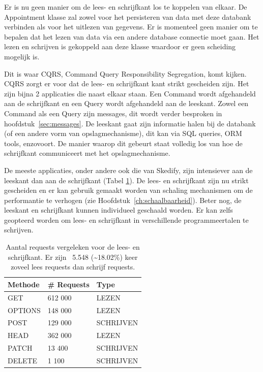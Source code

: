 
Er is nu geen manier om de lees- en schrijfkant los te koppelen van elkaar. De Appointment klasse zal zowel voor het persisteren van data met deze databank verbinden als voor het uitlezen van gegevens. Er is momenteel geen manier om te bepalen dat het lezen van data via een andere database connectie moet gaan. Het lezen en schrijven is gekoppeld aan deze klasse waardoor er geen scheiding mogelijk is.

Dit is waar \gls{CQRS}, Command Query Responsibility Segregation, komt kijken. \gls{CQRS} zorgt er voor dat de lees- en schrijfkant kant strikt gescheiden zijn. Het zijn bijna 2 applicaties die naast elkaar staan. Een Command wordt afgehandeld aan de schrijfkant en een Query wordt afgehandeld aan de leeskant. Zowel een Command als een Query zijn messages, dit wordt verder besproken in hoofdstuk~\ref{sec:messages}. De leeskant gaat zijn informatie halen bij de databank (of een andere vorm van opslagmechanisme), dit kan via \gls{SQL} queries, \gls{ORM} tools, enzovoort. De manier waarop dit gebeurt staat volledig los van hoe de schrijfkant communiceert met het opslagmechanisme.

De meeste applicaties, onder andere ook die van Skedify, zijn intensiever aan de leeskant dan aan de schrijfkant (Tabel \ref{cqrs-read-writes}). De lees- en schrijfkant zijn nu strikt gescheiden en er kan gebruik gemaakt worden van schaling mechanismen om de performantie te verhogen (zie Hoofdstuk~\ref{ch:schaalbaarheid}). Beter nog, de leeskant en schrijfkant kunnen individueel geschaald worden. Er kan zelfs geopteerd worden om lees- en schrijfkant in verschillende programmeertalen te schrijven.

\begin{table}[h]
\centering
\caption[Aantal requests vergeleken voor de lees- en schrijfkant.]{Aantal requests vergeleken voor de lees- en schrijfkant. Er zijn ~5.548 (\textasciitilde18.02\%) keer zoveel lees requests dan schrijf requests.}
\begin{tabular}{lll} \toprule
Methode & \# Requests & Type        \\ \midrule
GET     & 612 000     & LEZEN       \\
OPTIONS & 148 000     & LEZEN       \\
POST    & 129 000     & SCHRIJVEN   \\
HEAD    & 362 000     & LEZEN       \\
PATCH   & 13 400      & SCHRIJVEN   \\
DELETE  & 1 100       & SCHRIJVEN   \\ \bottomrule
\end{tabular}
\label{cqrs-read-writes}
\end{table}

